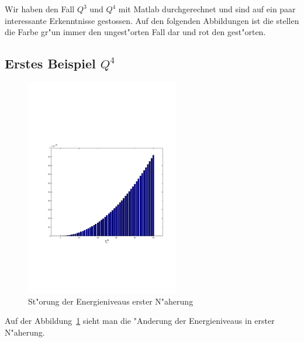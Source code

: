 \begin{refsection}
Wir haben den Fall $Q^3$ und $Q^4$ mit Matlab durchgerechnet und sind auf ein paar interessante Erkenntnisse gestossen. Auf den folgenden Abbildungen ist die stellen die Farbe gr"un immer den ungest"orten Fall dar und rot den gest"orten.

\subsection{Erstes Beispiel $Q^4$}

\begin{figure}	%
\centering
\includegraphics[width=0.6\textwidth]{anharmonisch/images/x4/EK1.pdf}
\caption{St"orung der Energieniveaus erster N"aherung
\label{skript:x4_EK1}}
\end{figure}

Auf der Abbildung~\ref{skript:x4_EK1} sieht man die "Anderung der Energieniveaus in erster N"aherung. 


\end{refsection}
